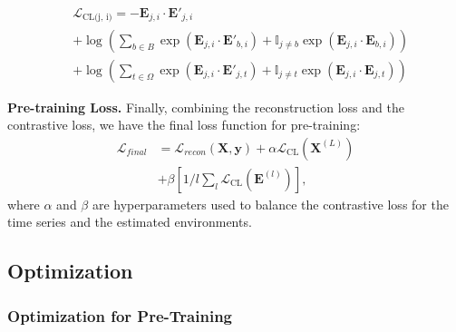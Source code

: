 {
\small
\begin{align}
\label{Eq: CL}
&\mathcal{L}_{\text{CL(j, i)}} = - \mathbf{E}_{j,i} \cdot \mathbf{E'}_{j,i} \nonumber \\
&+ \log \left( \sum_{b\in B} \exp \left( \mathbf{E}_{j,i} \cdot \mathbf{E'}_{b,i} \right) + \mathbb{I}_{j \neq b} \exp \left( \mathbf{E}_{j,i} \cdot \mathbf{E}_{b,i} \right) \right) \nonumber \\
&+ \log \left( \sum_{t \in \Omega} \exp \left( \mathbf{E}_{j,i} \cdot \mathbf{E'}_{j,t} \right) + \mathbb{I}_{j \neq t} \exp \left( \mathbf{E}_{j,i} \cdot \mathbf{E}_{j,t} \right) \right)
\tag{7}
\end{align}
}



\textbf{Pre-training Loss.} Finally, combining the reconstruction loss and the contrastive loss, we have the final loss function for pre-training:
\begin{align}
\mathcal{L}_{final} &= \mathcal{L}_{recon}(\mathbf{X}, \mathbf{y})  + \alpha  \mathcal{L}_{\text{CL}}(\mathbf{X}^{(L)}) \nonumber \\
&+ \beta [ 1/l \sum_l \mathcal{L}_{\text{CL}}(\mathbf{E}^{(l)}) ], \tag{8}
\end{align}
where $\alpha$ and $\beta$ are hyperparameters used to balance the contrastive loss for the time series and the estimated environments.


\subsection{Optimization}
\subsubsection{Optimization for Pre-Training}


